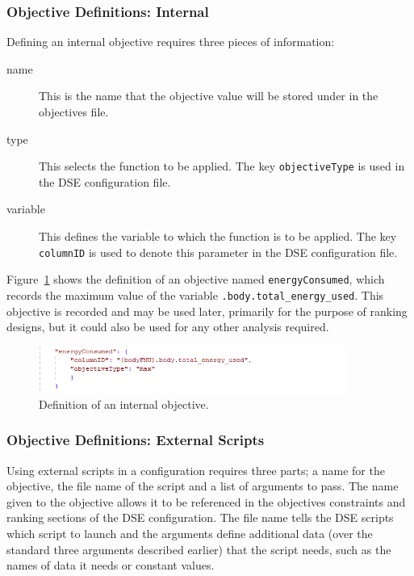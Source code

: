 \subsubsection{Objective Definitions: Internal}\label{sec:dse:edit:objectivesinternal}


Defining an internal objective requires three pieces of information:
%
%
%
\begin{description}
	\item[name] This is the name that the objective value will be stored under in the objectives file.
	\item[type] This selects the function to be applied.  The key \texttt{objectiveType} is used in the DSE configuration file.
	\item[variable] This defines the variable to which the function is to be applied.  The key \texttt{columnID} is used to denote this parameter in the DSE configuration file.
\end{description}
%
%
%
Figure~\ref{fig:dse:edit:objectivesinternal} shows the definition of an objective named \texttt{energy\-Consumed}, which records the maximum value of the variable \newline \texttt{.body.total\_energy\_used}.  This objective is recorded and may be used later, primarily for the purpose of ranking designs, but it could also be used for any other analysis required.
%
%
%
\begin{figure}
	\centering
	\includegraphics[width=0.9\textwidth]{figures/dse/config-objectivesinternal}
	\caption{Definition of an internal objective.}\label{fig:dse:edit:objectivesinternal}
\end{figure}
%
%
%
\subsubsection{Objective Definitions: External Scripts}\label{sec:dse:edit:objectivesexternal}

Using external scripts in a configuration requires three parts; a name for the objective, the file name of the script and a list of arguments to pass.  The name given to the objective allows it to be referenced in the objectives constraints and ranking sections of the DSE configuration.  The file name tells the DSE scripts which script to launch and the arguments define additional data (over the standard three arguments described earlier) that the script needs, such as the names of data it needs or constant values.


